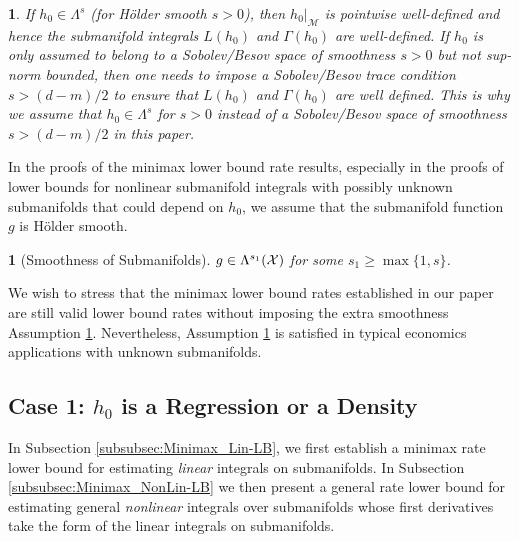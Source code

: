 \documentclass[12pt,american]{article}
\theoremstyle{definition}
\theoremstyle{plain}
\newtheorem{assumption}{\protect\assumptionname}
\theoremstyle{definition}
\theoremstyle{plain}
\theoremstyle{plain}
\theoremstyle{plain}
\theoremstyle{plain}
\newtheorem{rem}{\protect\remarkname}
\theoremstyle{plain}
\providecommand{\assumptionname}{Assumption}
\providecommand{\remarkname}{Remark}
\providecommand{\assumptionname}{Assumption}
\begin{document}
\begin{rem}
  If $h_0\in \Lambda^s$ (for H\"older smooth $s>0$), then $h_0|_{\mathcal{M}}$ is pointwise well-defined and hence the submanifold integrals $L(h_0)$ and $\Gamma(h_0)$ are well-defined. If $h_0$ is only assumed to belong to a Sobolev/Besov space of smoothness $s>0$ but not sup-norm bounded, then one needs to impose a Sobolev/Besov trace condition $s>(d-m)/2$ to ensure that $L(h_0)$ and $\Gamma(h_0)$ are well defined. This is why we assume that $h_0\in  \Lambda^s$ for $s>0$ instead of a Sobolev/Besov space of smoothness $s>(d-m)/2$ in this paper.
\end{rem}

In the proofs of the minimax lower bound rate results, especially in the proofs of lower bounds for nonlinear submanifold integrals with possibly unknown submanifolds that could depend on $h_0$, we assume that the submanifold function $g$ is H\"{o}lder smooth.
\begin{assumption}[Smoothness of Submanifolds]
  \label{assu:Jacob}  $g\in \Lambda^{s_1}({\cal X})$ for some $s_1 \geq \max\{1,s\}$.
\end{assumption}

We wish to stress that the minimax lower bound rates established in our paper are still valid lower bound rates without imposing the extra smoothness Assumption \ref{assu:Jacob}. Nevertheless, Assumption \ref{assu:Jacob} is satisfied in typical economics applications with unknown submanifolds.

\subsection{\label{subsec:Minimax_Reg-LB} Case 1: $h_0$ is a Regression or a Density}

In Subsection \ref{subsubsec:Minimax_Lin-LB}, we first establish a minimax rate lower bound for estimating \emph{linear} integrals on submanifolds. In Subsection \ref{subsubsec:Minimax_NonLin-LB} we then present a general rate lower bound for estimating general  \emph{nonlinear} integrals over submanifolds whose first derivatives take the form of the linear integrals on submanifolds.
\end{document}
